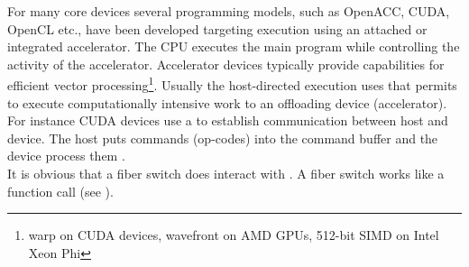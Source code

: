 
For many core devices several programming models, such as OpenACC, CUDA, OpenCL
etc., have been developed targeting  execution using an
attached or integrated accelerator. The CPU executes the main program while
controlling the activity of the accelerator. Accelerator devices typically
provide capabilities for efficient vector processing\footnote{warp on CUDA
devices, wavefront on AMD GPUs, 512-bit SIMD on Intel Xeon Phi}. Usually the
host-directed execution uses  that permits to
execute computationally intensive work to an offloading device
(accelerator)\cite{OpenAcc}.\\
For instance CUDA devices use a  to establish communication
between host and device. The host puts commands (op-codes) into the command
buffer and the device process them \cite{CUDA}.\\
It is obvious that a fiber switch does  interact with
. A fiber switch works like a function
call (see ).
